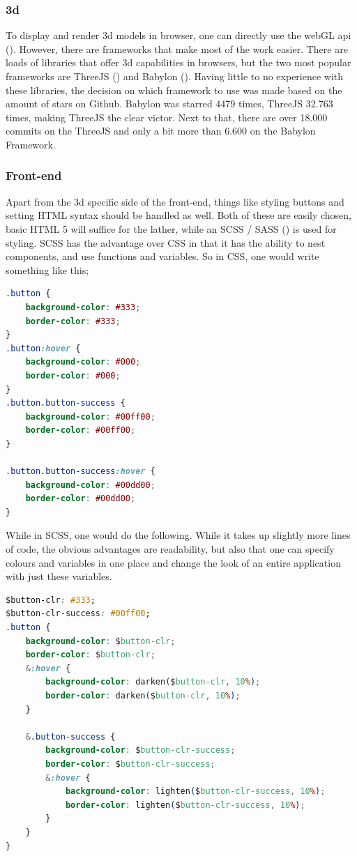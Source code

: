 \subsubsection{3d}
\label{subsub: 3d}
To display and render 3d models in browser, one can directly use the webGL api (\cite{webGL}). However, there are frameworks that make most of the work easier. There are loads of libraries that offer 3d capabilities in browsers, but the two most popular frameworks are ThreeJS (\cite{threejs}) and Babylon (\cite{babylon}). Having little to no experience with these libraries, the decision on which framework to use was made based on the amount of stars on Github. Babylon was starred 4479 times, ThreeJS 32.763 times, making ThreeJS the clear victor. Next to that, there are over 18.000 commits on the ThreeJS and only a bit more than 6.600 on the Babylon Framework.

\subsubsection{Front-end}
\label{subsub: frontEnd}
Apart from the 3d specific side of the front-end, things like styling buttons and setting HTML syntax should be handled as well. Both of these are easily chosen, basic HTML 5 will suffice for the lather, while an SCSS / SASS (\cite{scss}) is used for styling. SCSS has the advantage over CSS in that it has the ability to nest components, and use functions and variables. So in CSS, one would write something like this;

\begin{lstlisting}[language=CSS]
.button {
	background-color: #333;
	border-color: #333;
}
.button:hover {
	background-color: #000;
	border-color: #000;
}
.button.button-success {
	background-color: #00ff00;
	border-color: #00ff00;
}

.button.button-success:hover {
	background-color: #00dd00;
	border-color: #00dd00;
}
\end{lstlisting}

\clearpage
While in SCSS, one would do the following. While it takes up slightly more lines of code, the obvious advantages are readability, but also that one can specify colours and variables in one place and change the look of an entire application with just these variables.

\begin{lstlisting}[language=CSS]
$button-clr: #333;
$button-clr-success: #00ff00;
.button {
	background-color: $button-clr;
	border-color: $button-clr;
	&:hover {
		background-color: darken($button-clr, 10%);
		border-color: darken($button-clr, 10%);
	}
	
	&.button-success {
		background-color: $button-clr-success;
		border-color: $button-clr-success;
		&:hover {
			background-color: lighten($button-clr-success, 10%);
			border-color: lighten($button-clr-success, 10%);
		}
	}
}
\end{lstlisting}

